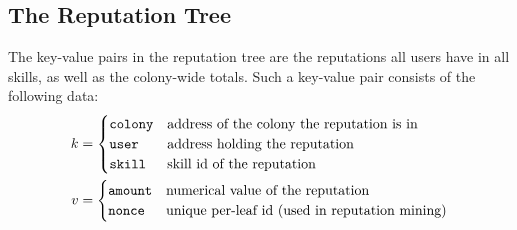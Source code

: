 \subsection{The Reputation Tree}\label{sec:reptree}

The key-value pairs in the reputation tree are the reputations all users have in all skills, as well as the colony-wide totals. Such a key-value pair consists of the following data:
\begin{align*}
k &=
  \begin{cases}
  \texttt{colony} & \textnormal{address of the colony the reputation is in}\\
  \texttt{user} & \textnormal{address holding the reputation}\\
  \texttt{skill} & \textnormal{skill id of the reputation}
  \end{cases}\\
v &=
  \begin{cases}
  \texttt{amount} & \textnormal{numerical value of the reputation}\\
  \texttt{nonce} & \textnormal{unique per-leaf id (used in reputation mining)}
  \end{cases}
\end{align*}

